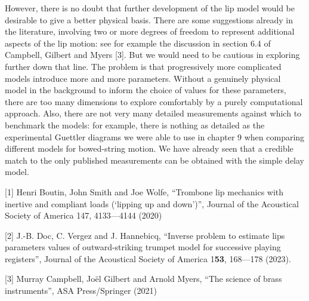   However, there is no doubt that further development of the lip model would be 
  desirable to give a better physical basis. There are some suggestions already 
  in the literature, involving two or more degrees of freedom to represent 
  additional aspects of the lip motion: see for example the discussion in 
  section 6.4 of Campbell, Gilbert and Myers [3]. But we would need to be 
  cautious in exploring further down that line. The problem is that 
  progressively more complicated models introduce more and more parameters. 
  Without a genuinely physical model in the background to inform the choice of 
  values for these parameters, there are too many dimensions to explore 
  comfortably by a purely computational approach. Also, there are not very many 
  detailed measurements against which to benchmark the models: for example, 
  there is nothing as detailed as the experimental Guettler diagrams we were 
  able to use in chapter 9 when comparing different models for bowed-string 
  motion. We have already seen that a credible match to the only published 
  measurements can be obtained with the simple delay model. 

  \sectionreferences{}[1] Henri Boutin, John Smith and Joe Wolfe, “Trombone lip 
  mechanics with inertive and compliant loads (‘lipping up and down’)”, Journal 
  of the Acoustical Society of America 147, 4133—4144 (2020) 

  [2] J.-B. Doc, C. Vergez and J. Hannebicq, “Inverse problem to estimate lips 
  parameters values of outward-striking trumpet model for successive playing 
  registers”, Journal of the Acoustical Society of America 1\textbf{53}, 
  168—178 (2023). 

  [3] Murray Campbell, Joël Gilbert and Arnold Myers, “The science of brass 
  instruments”, ASA Press/Springer (2021) 